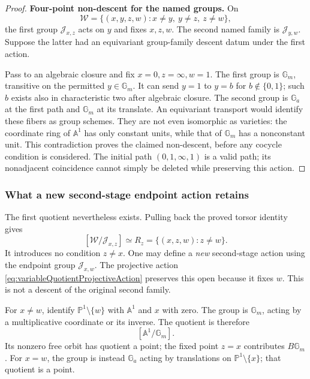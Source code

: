 \begin{proof}
\par\smallskip\noindent\textbf{Four-point non-descent for the named groups.}\quad
On
\[
 \mathcal W=\{(x,y,z,w):x\ne y,\ y\ne z,\ z\ne w\},
\]
the first group \(\mathcal J_{x,z}\) acts on \(y\)
and fixes \(x,z,w\).
The second named family is \(\mathcal J_{y,w}\).
Suppose the latter had an equivariant group-family
descent datum under the first action.

Pass to an algebraic closure and fix
\(x=0,z=\infty,w=1\).
The first group is \(\mathbb G_m\), transitive on
the permitted \(y\in\mathbb G_m\).
It can send \(y=1\) to \(y=b\) for
\(b\notin\{0,1\}\); such \(b\) exists also in
characteristic two after algebraic closure.
The second group is \(\mathbb G_a\) at the first
path and \(\mathbb G_m\) at its translate.
An equivariant transport would identify these fibers
as group schemes.
They are not even isomorphic as varieties:
the coordinate ring of \(\mathbb A^1\) has only
constant units, while that of \(\mathbb G_m\)
has a nonconstant unit.
This contradiction proves the claimed non-descent,
before any cocycle condition is considered.
The initial path \((0,1,\infty,1)\) is a valid path;
its nonadjacent coincidence cannot simply be deleted
while preserving this action.
\end{proof}

\subsubsection{What a new second-stage endpoint action retains}

The first quotient nevertheless exists. Pulling
back the proved torsor identity gives
\[
 [\mathcal W/\mathcal J_{x,z}]
       \simeq R_z=\{(x,z,w):z\ne w\}.
\]
It introduces no condition \(z\ne x\).
One may define a \emph{new} second-stage action
using the endpoint group \(\mathcal J_{x,w}\).
The projective action
\eqref{eq:variableQuotientProjectiveAction}
preserves this open because it fixes \(w\).
This is not a descent of the original second family.

For \(x\ne w\), identify
\(\mathbb P^1\setminus\{w\}\) with \(\mathbb A^1\)
and \(x\) with zero.
The group is \(\mathbb G_m\), acting by a multiplicative
coordinate or its inverse.
The quotient is therefore
\[
                         [\mathbb A^1/\mathbb G_m].
\]
Its nonzero free orbit has quotient a point;
the fixed point \(z=x\) contributes \(B\mathbb G_m\).
For \(x=w\), the group is instead \(\mathbb G_a\)
acting by translations on \(\mathbb P^1\setminus\{x\}\);
that quotient is a point.

